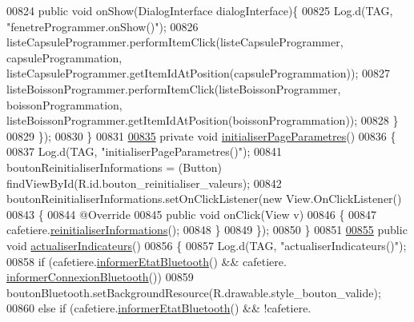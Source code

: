 \begin{DoxyCode}
00824             \textcolor{keyword}{public} \textcolor{keywordtype}{void} onShow(DialogInterface dialogInterface)\{
00825                 Log.d(TAG, \textcolor{stringliteral}{"fenetreProgrammer.onShow()"});
00826                 listeCapsuleProgrammer.performItemClick(listeCapsuleProgrammer, capsuleProgrammation, 
      listeCapsuleProgrammer.getItemIdAtPosition(capsuleProgrammation));
00827                 listeBoissonProgrammer.performItemClick(listeBoissonProgrammer, boissonProgrammation, 
      listeBoissonProgrammer.getItemIdAtPosition(boissonProgrammation));
00828             \}
00829         \});
00830     \}
00831 
\hyperlink{classcom_1_1example_1_1ekawa_1_1_ihm_af18a3c8df11503003c92e8e5de89b7c3}{00835}     \textcolor{keyword}{private} \textcolor{keywordtype}{void} \hyperlink{classcom_1_1example_1_1ekawa_1_1_ihm_af18a3c8df11503003c92e8e5de89b7c3}{initialiserPageParametres}()
00836     \{
00837         Log.d(TAG, \textcolor{stringliteral}{"initialiserPageParametres()"});
00841         boutonReinitialiserInformations = (Button) findViewById(R.id.bouton\_reinitialiser\_valeurs);
00842         boutonReinitialiserInformations.setOnClickListener(\textcolor{keyword}{new} View.OnClickListener()
00843         \{
00844             @Override
00845             \textcolor{keyword}{public} \textcolor{keywordtype}{void} onClick(View v)
00846             \{
00847                 cafetiere.\hyperlink{classcom_1_1example_1_1ekawa_1_1_cafetiere_a18e77fd60191cc0b2c7e247f72807096}{reinitialiserInformations}();
00848             \}
00849         \});
00850     \}
00851 
\hyperlink{classcom_1_1example_1_1ekawa_1_1_ihm_a2c3740dd5be20b3111b36649514fd41e}{00855}     \textcolor{keyword}{public} \textcolor{keywordtype}{void} \hyperlink{classcom_1_1example_1_1ekawa_1_1_ihm_a2c3740dd5be20b3111b36649514fd41e}{actualiserIndicateurs}()
00856     \{
00857         Log.d(TAG, \textcolor{stringliteral}{"actualiserIndicateurs()"});
00858         \textcolor{keywordflow}{if} (cafetiere.\hyperlink{classcom_1_1example_1_1ekawa_1_1_cafetiere_aeff88ad385713a7897074dcdb76077a5}{informerEtatBluetooth}() && cafetiere.
      \hyperlink{classcom_1_1example_1_1ekawa_1_1_cafetiere_a97d9ca4701a961fe8865ecfa1d5bf64a}{informerConnexionBluetooth}())
00859             boutonBluetooth.setBackgroundResource(R.drawable.style\_bouton\_valide);
00860         \textcolor{keywordflow}{else} \textcolor{keywordflow}{if} (cafetiere.\hyperlink{classcom_1_1example_1_1ekawa_1_1_cafetiere_aeff88ad385713a7897074dcdb76077a5}{informerEtatBluetooth}() && !cafetiere.

\end{DoxyCode}
